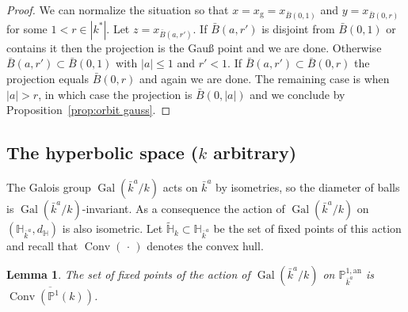 \documentclass[10pt]{amsart}
\newtheorem{lemm}[theo]{Lemma}\newtheorem{prop}[theo]{Proposition}\newtheorem{coro}[theo]{Corollary}\newtheorem{conj}[theo]{Conjecture}
\theoremstyle{definition}\newtheorem{defi}[theo]{Definition}\newtheorem{rema}[theo]{Remark}\newtheorem{exam}[theo]{Example}\newtheorem{exem}[theo]{Example}\newtheorem{nota}[theo]{Notation}
\DeclareMathOperator{\Gal}{Gal}
\DeclareMathOperator{\conv}{Conv}
\newcommand{\hh}{\mathbb{H}}
\newcommand{\an}{\mathrm{an}}
\newcommand{\abs}[1]{\left\vert#1\right\vert}
\newcommand{\PP}{\mathbb{P}}
\begin{document}
\begin{proof}
We can normalize the situation so that $x = x_{\mathrm{g}} = x_{\bar B(0,1)}$ and $y = x_{\bar B(0,r)}$ for some $1<r\in |k^*|$. Let $z = x_{\bar B(a, r')}$. If $\bar B(a, r')$ is disjoint from $\bar B(0,1)$ or contains it then the projection is the Gau{\ss} point and we are done. Otherwise $\bar B(a, r') \subset \bar B(0,1)$ with $\abs{a}\leq 1$ and $r'<1$. If $\bar B(a, r') \subset \bar B(0,r)$ the projection equals $\bar B(0,r)$ and again we are done. The remaining case is when $\abs{a} >r $, in which case the projection is $\bar B(0,\abs{a})$ and we conclude by Proposition~\ref{prop:orbit gauss}.
\end{proof}

\subsection{The hyperbolic space (\texorpdfstring{$k$}{k} arbitrary)} \label{subs:hyperbolic arbitrary}

The Galois group $\Gal(\bar{k}^a/k)$ acts on $\bar{k}^a$ by isometries, so the diameter of balls is $\Gal(\bar{k}^a/k)$-invariant. As a consequence the action of $\Gal(\bar{k}^a/k)$ on $(\hh_{\bar{k}^a},d_\hh)$ is also isometric. Let $\widetilde{\hh}_k\subset\hh_{\bar{k}^a}$ be the set of fixed points of this action and recall that $\conv({\,\cdot\,})$ denotes the convex hull.

\begin{lemm}\label{lem:fixx}
The set of fixed points of the action of $\Gal(\bar{k}^a/k)$ on $\PP^{1,\an}_{\bar{k}^a}$ is $\overline{\conv(\PP^1(k))}$.
\end{lemm}
\end{document}
